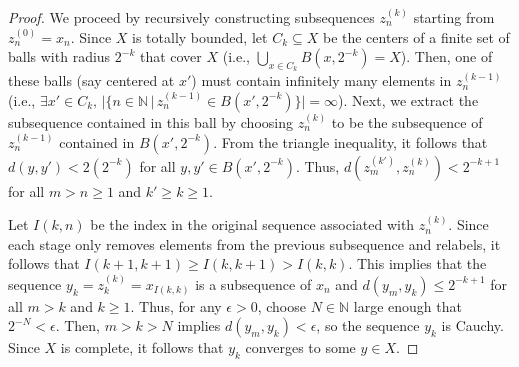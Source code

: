 \begin{proof}
We proceed by recursively constructing subsequences $z^{(k)}_n$ starting from $z^{(0)}_n = x_n$.
Since $X$ is totally bounded, let $C_k \subseteq X$ be the centers of a finite set of balls with radius $2^{-k}$ that cover $X$ (i.e., $\bigcup_{x\in C_k} B(x,2^{-k}) = X$).
Then, one of these balls (say centered at $x'$) must contain infinitely many elements in $z^{(k-1)}_n$ (i.e., $\exists x' \in C_k, \,|\{n\in \mathbb{N}\,|\,z^{(k-1)}_n \in B(x',2^{-k})\}|=\infty$).
Next, we extract the subsequence contained in this ball by choosing $z^{(k)}_n$ to be the subsequence of $z^{(k-1)}_n$ contained in $B(x',2^{-k})$.
From the triangle inequality, it follows that $d(y,y')<2(2^{-k})$ for all $y,y'\in B(x',2^{-k})$.
Thus, $d(z^{(k')}_m,z^{(k)}_n) < 2^{-k+1}$ for all $m>n\geq 1$ and $k'\geq k \geq 1$.

Let $I(k,n)$ be the index in the original sequence associated with $z^{(k)}_n$.
Since each stage only removes elements from the previous subsequence and relabels, it follows that $I(k+1,k+1) \geq I(k,k+1) > I(k,k)$.
This implies that the sequence $y_k = z^{(k)}_k = x_{I(k,k)}$ is a subsequence of $x_n$ and
$d(y_m,y_k) \leq 2^{-k+1}$ for all $m>k$ and $k\geq1$.
Thus, for any $\epsilon>0$, choose $N\in\mathbb N$ large enough that $2^{-N}<\epsilon$.
Then, $m>k>N$ implies $d(y_m,y_k)<\epsilon$, so the sequence $y_k$ is Cauchy.
Since $X$ is complete, it follows that $y_k$ converges to some $y\in X$.

\end{proof}

